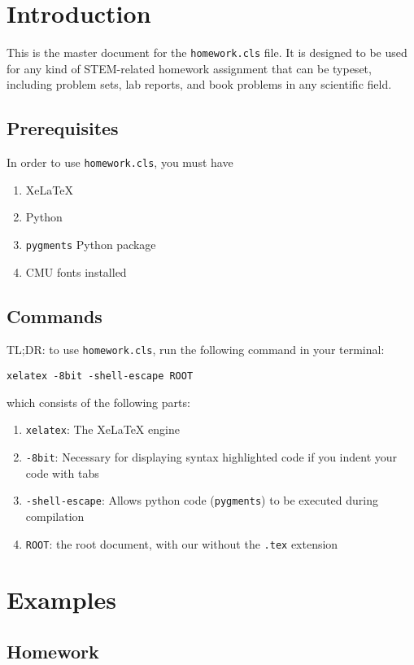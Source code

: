 \documentclass{homework}
\begin{document}
		\section{Introduction}
		This is the master document for the \texttt{homework.cls} file. It is designed to be used for any kind of STEM-related homework assignment that can be typeset, including problem sets, lab reports, and book problems in any scientific field.

		\subsection{Prerequisites}
		In order to use \texttt{homework.cls}, you must have
		\begin{enumerate}
			\item XeLaTeX
			\item Python
			\item \texttt{pygments} Python package
			\item CMU fonts installed
		\end{enumerate}

		\subsection{Commands}
		TL;DR: to use \texttt{homework.cls}, run the following command in your terminal:
\begin{verbatim}
xelatex -8bit -shell-escape ROOT
\end{verbatim}
		which consists of the following parts:
		\begin{enumerate}
			\item \texttt{xelatex}: The XeLaTeX engine
			\item \texttt{-8bit}: Necessary for displaying syntax highlighted code if you indent your code with tabs
			\item \texttt{-shell-escape}: Allows python code (\texttt{pygments}) to be executed during compilation
			\item \texttt{ROOT}: the root document, with our without the \texttt{.tex} extension
		\end{enumerate}

		\section{Examples}
		\subsection{Homework}
\end{document}
